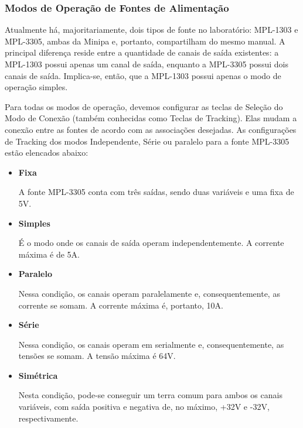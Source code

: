 \subsubsection{Modos de Operação de Fontes de Alimentação}

Atualmente há, majoritariamente, dois tipos de fonte no laboratório: MPL-1303 e MPL-3305, ambas da Minipa e, portanto, compartilham do mesmo manual. A principal diferença reside entre a quantidade de canais de saída existentes: a MPL-1303 possui apenas um canal de saída, enquanto a MPL-3305 possui dois canais de saída. Implica-se, então, que a MPL-1303 possui apenas o modo de operação simples.

Para todas os modos de operação, devemos configurar as teclas de Seleção do Modo de Conexão (também conhecidas como Teclas de Tracking). Elas mudam a conexão entre as fontes de acordo com as associações desejadas. As configurações de Tracking dos modos Independente, Série ou paralelo para a fonte MPL-3305 estão elencados abaixo:


\begin{itemize}
     
    \item \textbf{Fixa}

        A fonte MPL-3305 conta com três saídas, sendo duas variáveis e uma fixa de 5V.
        
        \newpage

    \item \textbf{Simples}

        É o modo onde os canais de saída operam independentemente. A corrente máxima é de 5A.

    \item \textbf{Paralelo}

        Nessa condição, os canais operam paralelamente e, consequentemente, as corrente se somam. A corrente máxima é, portanto, 10A.


    \item \textbf{Série}

        Nessa condição, os canais operam em serialmente e, consequentemente, as tensões se somam. A tensão máxima é 64V.

    \item \textbf{Simétrica}
    
        Nesta condição, pode-se conseguir um terra comum para ambos os canais variáveis, com saída positiva e negativa de, no máximo, +32V e -32V, respectivamente. 
    
\end{itemize}


